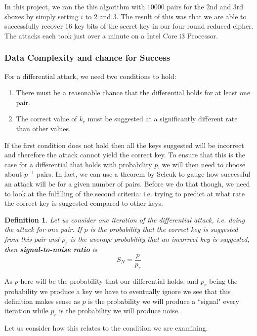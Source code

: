 \documentclass[12pt,a4paper]{article}
\newtheorem{definition}[theorem]{Definition}
\begin{document}
In this project, we ran the this algorithm with $10000$ pairs for the 2nd and
3rd sboxes by simply setting $i$ to 2 and 3. The result of this was that we are
able to successfully recover 16 key bits of the secret key in our four round
reduced cipher. The attacks each took just over a minute on a Intel Core i3
Processor.
\subsubsection{Data Complexity and chance for Success}

For a differential attack, we need two conditions to hold:
\begin{enumerate}
    \item There must be a reasonable chance that the differential holds for at
    least one pair. 
    \item The correct value of $k_r$ must be suggested at a significantly different
    rate than other values.
\end{enumerate}

If the first condition does not hold then all the keys suggested will be
incorrect and therefore the attack cannot yield the correct key. To ensure that this is the case
for a differential that holds with probability $p$, we will then need to choose
about $p^{-1}$
pairs. In fact, we can use a theorem by Selcuk \cite{selccuk2008probability} to
gauge how successful an attack will be for a given number of pairs. Before we
do that though, we need to look at the fulfilling of the second criteria: i.e.
trying to predict at what rate the correct key is suggested compared to other
keys.

\begin{definition}
Let us consider one iteration of the differential attack, i.e. doing the attack
for one pair. If $p$ is the probability that the correct key is suggested
from this pair and $p_r$ is the average probability that an incorrect key is
suggested, then \textbf{signal-to-noise ratio} is
\[S_N = \frac{p}{p_r}\]
\end{definition}

As $p$ here will be the probability that our differential holds, and $p_r$
being the probability we produce a key we have to eventually ignore we see that
this definition makes sense as $p$ is the probability we will produce a ``signal"
every iteration while $p_r$ is the probability we will produce noise.

Let us consider how this relates to the condition we are examining.
\end{document}
